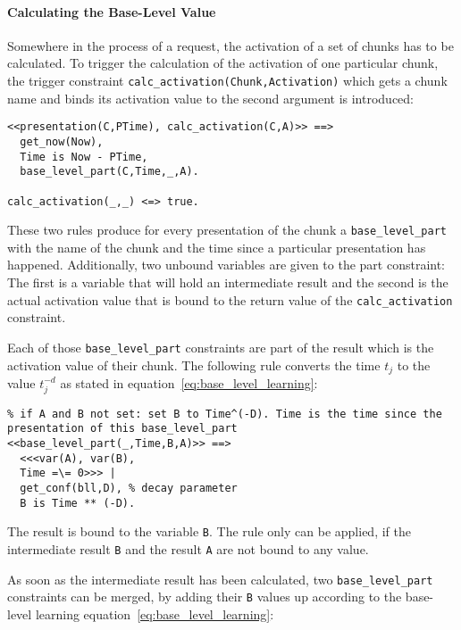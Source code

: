 \paragraph{Calculating the Base-Level Value}

Somewhere in the process of a request, the activation of a set of chunks has to be calculated. To trigger the calculation of the activation of one particular chunk, the trigger constraint \lstinline|calc_activation(Chunk,Activation)| which gets a chunk name and binds its activation value to the second argument is introduced:

\begin{lstlisting}
<<presentation(C,PTime), calc_activation(C,A)>> ==> 
  get_now(Now), 
  Time is Now - PTime, 
  base_level_part(C,Time,_,A).
  
calc_activation(_,_) <=> true.
\end{lstlisting}

These two rules produce for every presentation of the chunk a \lstinline|base_level_part| with the name of the chunk and the time since a particular presentation has happened. Additionally, two unbound variables are given to the part constraint: The first is a variable that will hold an intermediate result and the second is the actual activation value that is bound to the return value of the \lstinline|calc_activation| constraint.

Each of those \lstinline|base_level_part| constraints are part of the result which is the activation value of their chunk. The following rule converts the time $t_j$ to the value $t_j^{-d}$ as stated in equation~\eqref{eq:base_level_learning}:

\begin{lstlisting}
% if A and B not set: set B to Time^(-D). Time is the time since the presentation of this base_level_part
<<base_level_part(_,Time,B,A)>> ==>
  <<<var(A), var(B), 
  Time =\= 0>>> |
  get_conf(bll,D), % decay parameter
  B is Time ** (-D).
\end{lstlisting}

The result is bound to the variable \lstinline|B|. The rule only can be applied, if the intermediate result \lstinline|B| and the result \lstinline|A| are not bound to any value.

As soon as the intermediate result has been calculated, two \lstinline|base_level_part| constraints can be merged, by adding their \lstinline|B| values up according to the base-level learning equation~\eqref{eq:base_level_learning}:

